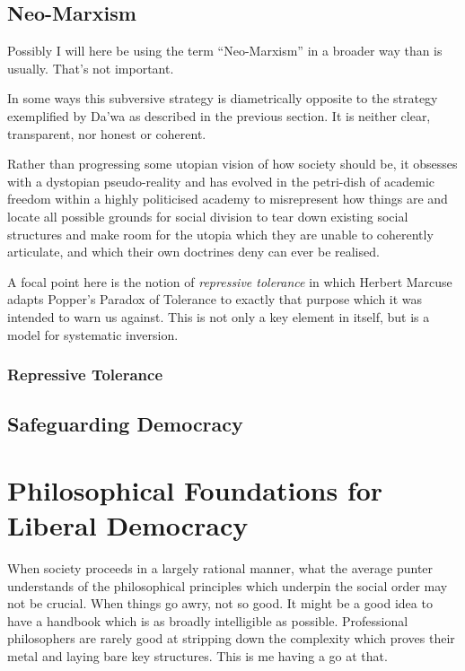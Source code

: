 \documentclass[10pt,titlepage]{book}
\begin{document}
\section{Neo-Marxism}

Possibly I will here be using the term ``Neo-Marxism'' in a broader way than is usually.
That's not important.

In some ways this subversive strategy is diametrically opposite to the strategy exemplified by Da'wa as described in the previous section.
It is neither clear, transparent, nor honest or coherent.

Rather than progressing some utopian vision of how society should be, it obsesses with a dystopian pseudo-reality and has evolved in the petri-dish of academic freedom within a highly politicised academy to misrepresent how things are and locate all possible grounds for social division to tear down existing social structures and make room for the utopia which they are unable to coherently articulate, and which their own doctrines deny can ever be realised.

A focal point here is the notion of \emph{repressive tolerance} in which Herbert Marcuse adapts Popper's Paradox of Tolerance to exactly that purpose which it was intended to warn us against\cite{marcuse-repressive}.
This is not only a key element in itself, but is a model for systematic inversion.

\subsection{Repressive Tolerance}

\section{Safeguarding Democracy}

\chapter{Philosophical Foundations for Liberal Democracy}

When society proceeds in a largely rational manner, what the average punter understands of the philosophical principles which underpin the social order may not be crucial.
When things go awry, not so good.
It might be a good idea to have a handbook which is as broadly intelligible as possible.
Professional philosophers are rarely good at stripping down the complexity which proves their metal and laying bare key structures.
This is me having a go at that.
\end{document}
